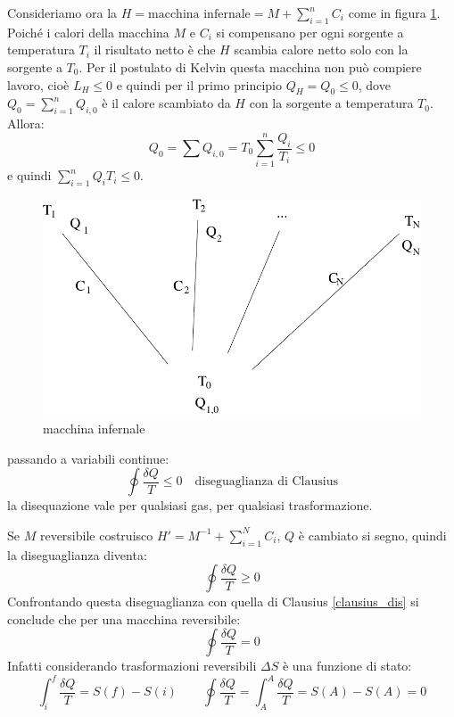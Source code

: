 Consideriamo ora la $H=\text{macchina infernale}=M+\sum_{i=1}^{n}C_i$ come in figura \ref{fig:hell_machine}. Poiché i calori della macchina $M$ e $C_i$ si compensano per ogni sorgente a temperatura $T_i$ il risultato netto è che $H$ scambia calore netto solo con la sorgente a $T_0$. Per il postulato di Kelvin questa macchina non può compiere lavoro, cioè $L_H \leq 0$ e quindi per il primo principio $Q_H = Q_0 \leq 0$, dove $Q_0 = \sum_{i=1}^n Q_{i,0}$ è il calore scambiato da $H$ con la sorgente a temperatura $T_0$. Allora:
\[
   Q_0 = \sum Q_{i,0} = T_0\sum_{i=1}^{n} \frac{Q_i}{T_i}\leq 0
\]
e quindi $\sum_{i=1}^n{Q_i}{T_i}\leq 0$.

\begin{figure}[htbp]
   \centering
   \includegraphics[scale=0.5]{immagini/fisica1/hell_machine}
   \caption{macchina infernale}
   \label{fig:hell_machine}
\end{figure}

passando a variabili continue:
\begin{equation}
   \oint\frac{\delta Q}{T}\leq 0\quad\text{diseguaglianza di Clausius}
   \label{clausius_dis}
\end{equation}
la disequazione vale per qualsiasi gas, per qualsiasi trasformazione.

Se $M$ reversibile costruisco $H'=M^{-1}+\sum_{i=1}^N C_i$, $Q$ è cambiato si segno, quindi la diseguaglianza diventa:
\[\oint\frac{\delta Q}{T}\geq0\]
Confrontando questa diseguaglianza con quella di Clausius \eqref{clausius_dis} si conclude che per una macchina reversibile:
\begin{equation}
   \oint\frac{\delta Q}{T}=0
\end{equation}
Infatti considerando trasformazioni reversibili $\Delta S$ è una funzione di stato:
\[\int_i^f\frac{\delta Q}{T}=S(f)-S(i)\qquad\oint\frac{\delta Q}{T}=\int_A^A\frac{\delta Q}{T}=S(A)-S(A)=0\]

